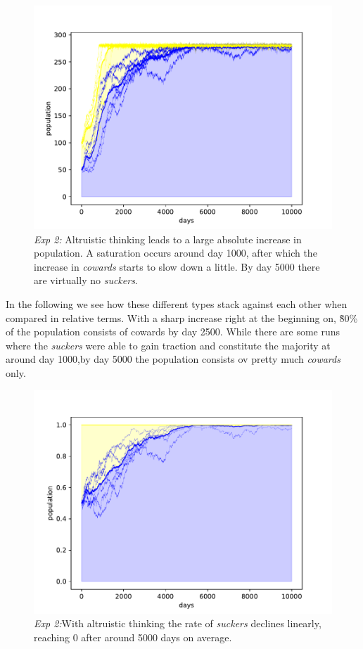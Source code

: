 \documentclass[sigconf]{acmart}
\newcommand{\cowards}{\textit{cowards}\xspace}
\newcommand{\suckers}{\textit{suckers}\xspace}
\begin{document}
    \begin{figure}
        \includegraphics[width=\columnwidth]{figures/alt_cow_increase_separated}
        \caption{\textit{Exp 2:} Altruistic thinking leads to a large absolute increase in population.
        A saturation occurs around day 1000, after which the increase in \cowards starts to slow down a little.
        By day 5000 there are virtually no \suckers.}
        \label{fig:alt_cow_separated}
    \end{figure}

    In the following  we see how these different types stack against each other when compared in relative terms.
    With a sharp increase right at the beginning on, \~ 80\% of the population consists of cowards by day 2500.
    While there are some runs where the \suckers were able to gain traction and constitute the majority at around day 1000,by day 5000 the population consists ov pretty much \cowards only.


    \begin{figure}
        \includegraphics[width=\columnwidth]{figures/alt_cow_increase_separated_rel}
        \caption{\textit{Exp 2:}With altruistic thinking the rate of \suckers declines linearly, reaching 0 after around 5000 days on average.}
        \label{fig:alt_cow_separated_rel}
    \end{figure}
\end{document}
